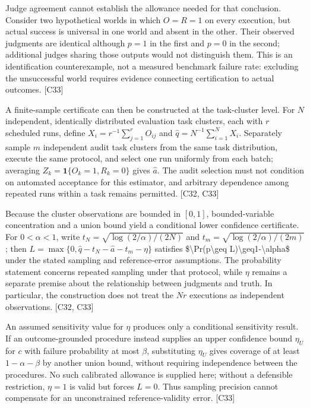 \documentclass[11pt]{article}
\begin{document}
Judge agreement cannot establish the allowance needed for that conclusion. Consider two hypothetical worlds in which $O=R=1$ on every execution, but actual success is universal in one world and absent in the other. Their observed judgments are identical although $p=1$ in the first and $p=0$ in the second; additional judges sharing those outputs would not distinguish them. This is an identification counterexample, not a measured benchmark failure rate: excluding the unsuccessful world requires evidence connecting certification to actual outcomes. [C33]

A finite-sample certificate can then be constructed at the task-cluster level. For $N$ independent, identically distributed evaluation task clusters, each with $r$ scheduled runs, define $X_i=r^{-1}\sum_{j=1}^{r}O_{ij}$ and $\widehat q=N^{-1}\sum_{i=1}^{N}X_i$. Separately sample $m$ independent audit task clusters from the same task distribution, execute the same protocol, and select one run uniformly from each batch; averaging $Z_k=\mathbf{1}\{O_k=1,R_k=0\}$ gives $\widehat a$. The audit selection must not condition on automated acceptance for this estimator, and arbitrary dependence among repeated runs within a task remains permitted. [C32, C33]

Because the cluster observations are bounded in $[0,1]$, bounded-variable concentration and a union bound yield a conditional lower confidence certificate. For $0<\alpha<1$, write $t_N=\sqrt{\log(2/\alpha)/(2N)}$ and $t_m=\sqrt{\log(2/\alpha)/(2m)}$; then $L=\max\{0,\widehat q-t_N-\widehat a-t_m-\eta\}$ satisfies \$\textbackslash{}Pr(p\textbackslash{}geq L)\textbackslash{}geq1-\textbackslash{}alpha\$ under the stated sampling and reference-error assumptions. The probability statement concerns repeated sampling under that protocol, while $\eta$ remains a separate premise about the relationship between judgments and truth. In particular, the construction does not treat the $Nr$ executions as independent observations. [C32, C33]

An assumed sensitivity value for $\eta$ produces only a conditional sensitivity result. If an outcome-grounded procedure instead supplies an upper confidence bound $\eta_U$ for $c$ with failure probability at most $\beta$, substituting $\eta_U$ gives coverage of at least $1-\alpha-\beta$ by another union bound, without requiring independence between the procedures. No such calibrated allowance is supplied here; without a defensible restriction, $\eta=1$ is valid but forces $L=0$. Thus sampling precision cannot compensate for an unconstrained reference-validity error. [C33]
\end{document}
